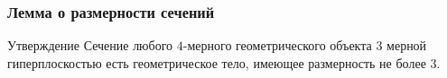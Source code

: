 \documentclass[10pt,pdf,hyperref={unicode}]{beamer}
\begin{document}
\begin{frame}
	\frametitle{Лемма о размерности сечений}
{\small
	\begin{block}{Утверждение}
		Сечение любого $4$-мерного геометрического объекта $3$ мерной гиперплоскостью есть геометрическое тело, имеющее размерность не более $3$. 
	\end{block}
}
	\begin{columns}
	\end{columns}
\end{frame}
\end{document}
